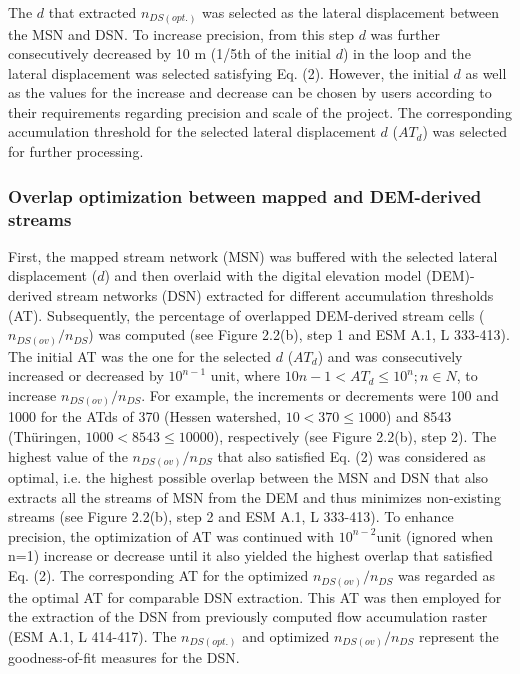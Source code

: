 The $d$ that extracted $n_{DS(opt.)}$ was selected as the lateral displacement between the MSN and DSN. To increase precision, from this step $d$ was further consecutively decreased by 10 m (1/5th of the initial $d$) in the loop and the lateral displacement was selected satisfying Eq. (2). However, the initial $d$ as well as the values for the increase and decrease can be chosen by users according to their requirements regarding precision and scale of the project. The corresponding accumulation threshold for the selected lateral displacement $d$ ($AT_d$) was selected for further processing.

\subsubsection{Overlap optimization between mapped and DEM-derived streams}
\label{Overlap optimization between mapped and DEM-derived streams}

First, the mapped stream network (MSN) was buffered with the selected lateral displacement ($d$) and then overlaid with the digital elevation model (DEM)-derived stream networks (DSN) extracted for different accumulation thresholds (AT). Subsequently, the percentage of overlapped DEM-derived stream cells ($n_{DS(ov)}/n_{DS}$) was computed (see Figure 2.2(b), step 1 and ESM A.1, L 333-413). The initial AT was the one for the selected $d$ ($AT_d$) and was consecutively increased or decreased by $10^{n-1}$ unit, where $10{n-1}<AT_d\leq 10^n; n \in N$, to increase $n_{DS(ov)}/n_{DS}$. For example, the increments or decrements were 100 and 1000 for the ATds of 370 (Hessen watershed, $10<370\leq 1000$) and 8543 (Thüringen, $1000<8543\leq 10000$), respectively (see Figure 2.2(b), step 2). The highest value of the $n_{DS(ov)}/n_{DS}$ that also satisfied Eq. (2) was considered as optimal, i.e. the highest possible overlap between the MSN and DSN that also extracts all the streams of MSN from the DEM and thus minimizes non-existing streams (see Figure 2.2(b), step 2 and ESM A.1, L 333-413). To enhance precision, the optimization of AT was continued with $10^{n-2}$unit (ignored when n=1) increase or decrease until it also yielded the highest overlap that satisfied Eq. (2). The corresponding AT for the optimized $n_{DS(ov)}/n_{DS}$ was regarded as the optimal AT for comparable DSN extraction. This AT was then employed for the extraction of the DSN from previously computed flow accumulation raster (ESM A.1, L 414-417). The $n_{DS(opt.)}$ and optimized $n_{DS(ov)}/n_{DS}$  represent the goodness-of-fit measures for the DSN.

